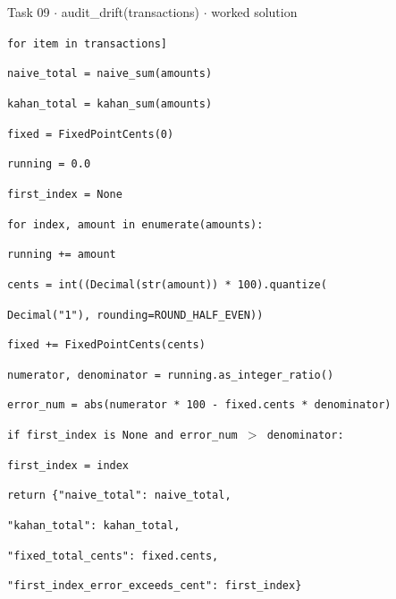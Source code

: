 \documentclass[11pt]{article}
\begin{document}
\begin{keepsection}
\begin{workedbox}{Task 09 \ensuremath{\cdot} audit\_drift(transactions) \ensuremath{\cdot} worked solution}
\begin{enumerate}
\begin{tcolorbox}[colback=Paperblue,colframe=Paperblue,boxrule=0pt,arc=0pt,left=7pt,right=7pt,top=5pt,bottom=5pt]
\noindent\hspace*{6em}\texttt{for item in transactions]}\par
\noindent\hspace*{1em}\texttt{naive\_total = naive\_sum(amounts)}\par
\noindent\hspace*{1em}\texttt{kahan\_total = kahan\_sum(amounts)}\par
\noindent\hspace*{1em}\texttt{fixed = FixedPointCents(0)}\par
\noindent\hspace*{1em}\texttt{running = 0.0}\par
\noindent\hspace*{1em}\texttt{first\_index = None}\par
\noindent\hspace*{1em}\texttt{for index, amount in enumerate(amounts):}\par
\noindent\hspace*{3em}\texttt{running += amount}\par
\noindent\hspace*{3em}\texttt{cents = int((Decimal(str(amount)) * 100).quantize(}\par
\noindent\hspace*{5em}\texttt{Decimal("1"), rounding=ROUND\_HALF\_EVEN))}\par
\noindent\hspace*{3em}\texttt{fixed += FixedPointCents(cents)}\par
\noindent\hspace*{3em}\texttt{numerator, denominator = running.as\_integer\_ratio()}\par
\noindent\hspace*{3em}\texttt{error\_num = abs(numerator * 100 - fixed.cents * denominator)}\par
\noindent\hspace*{3em}\texttt{if first\_index is None and error\_num \ensuremath{>} denominator:}\par
\noindent\hspace*{5em}\texttt{first\_index = index}\par
\noindent\hspace*{1em}\texttt{return \{"naive\_total": naive\_total,}\par
\noindent\hspace*{5em}\texttt{"kahan\_total": kahan\_total,}\par
\noindent\hspace*{5em}\texttt{"fixed\_total\_cents": fixed.cents,}\par
\noindent\hspace*{5em}\texttt{"first\_index\_error\_exceeds\_cent": first\_index\}}\par
\end{tcolorbox}
\end{enumerate}
\end{workedbox}


\end{keepsection}
\end{document}
